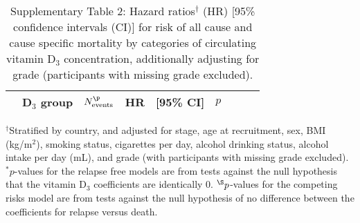 \documentclass[a4paper,10pt]{article}
\begin{document}
\begin{table}
\centering
\caption*{Supplementary Table 2: Hazard ratios$^\dag$ (HR) [95\% confidence 
intervals 
(CI)] for risk of all 
cause and cause specific mortality by categories of circulating vitamin D$_3$ 
concentration, additionally adjusting for grade (participants with missing 
grade excluded).}
\begin{tabular}{lrrrrrrrr}
\toprule
& D$_3$ group & $N_{\text{events}}^{\P}$ & HR & [95\% CI] & $p$ \\
\midrule

\bottomrule
\end{tabular}
\newline
{\footnotesize 
$^\dag$Stratified by country, and adjusted for stage, age at recruitment, sex, 
BMI (kg/m$^2$), smoking status, cigarettes per day, alcohol drinking status,
alcohol intake per day (mL), and grade (with participants with missing grade 
excluded).\newline
$^*p$-values for the relapse free models are from tests against the null 
hypothesis that the vitamin D$_3$ coefficients are identically 0. \newline
$^{\S}p$-values for the competing risks model are from tests against the null 
hypothesis of no difference between the coefficients for relapse versus death.
}
\end{table}
\clearpage
\end{document}
